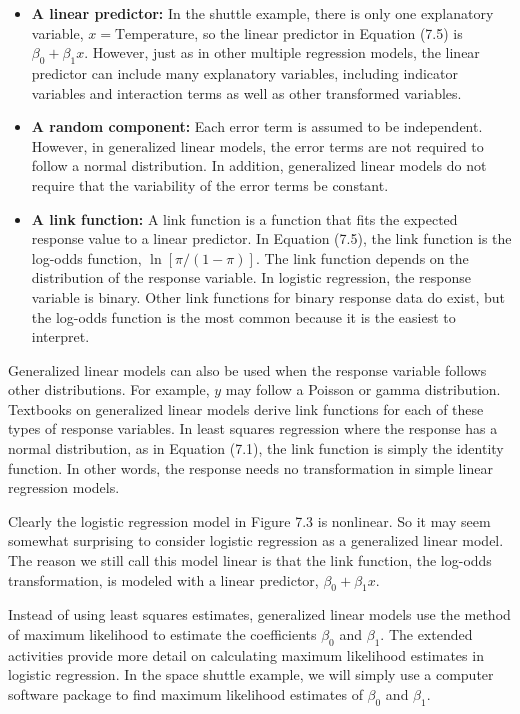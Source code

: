 \documentclass[
]{report}
\begin{document}
\begin{itemize}
  \item \textbf{A linear predictor:} In the shuttle example, there is only one explanatory variable, $x = \text{Temperature}$, so the linear predictor in Equation (7.5) is $\beta_0 + \beta_1 x$. However, just as in other multiple regression models, the linear predictor can include many explanatory variables, including indicator variables and interaction terms as well as other transformed variables.
  \item \textbf{A random component:} Each error term is assumed to be independent. However, in generalized linear models, the error terms are not required to follow a normal distribution. In addition, generalized linear models do not require that the variability of the error terms be constant.
  \item \textbf{A link function:} A link function is a function that fits the expected response value to a linear predictor. In Equation (7.5), the link function is the log-odds function, $\ln[\pi/(1 - \pi)]$. The link function depends on the distribution of the response variable. In logistic regression, the response variable is binary. Other link functions for binary response data do exist, but the log-odds function is the most common because it is the easiest to interpret.
\end{itemize}

Generalized linear models can also be used when the response variable follows other distributions. For example, \(y\) may follow a Poisson or gamma distribution. Textbooks on generalized linear models derive link functions for each of these types of response variables. In least squares regression where the response has a normal distribution, as in Equation (7.1), the link function is simply the identity function. In other words, the response needs no transformation in simple linear regression models.

Clearly the logistic regression model in Figure 7.3 is nonlinear. So it may seem somewhat surprising to consider logistic regression as a generalized linear model. The reason we still call this model linear is that the link function, the log-odds transformation, is modeled with a linear predictor, \(\beta_0 + \beta_1 x\).

Instead of using least squares estimates, generalized linear models use the method of maximum likelihood to estimate the coefficients \(\beta_0\) and \(\beta_1\). The extended activities provide more detail on calculating maximum likelihood estimates in logistic regression. In the space shuttle example, we will simply use a computer software package to find maximum likelihood estimates of \(\beta_0\) and \(\beta_1\).
\end{document}
